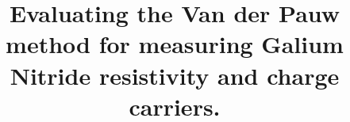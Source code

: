 \title{Evaluating the Van der Pauw method for measuring Galium Nitride resistivity and charge carriers.


\author{
		}
}
\maketitle
